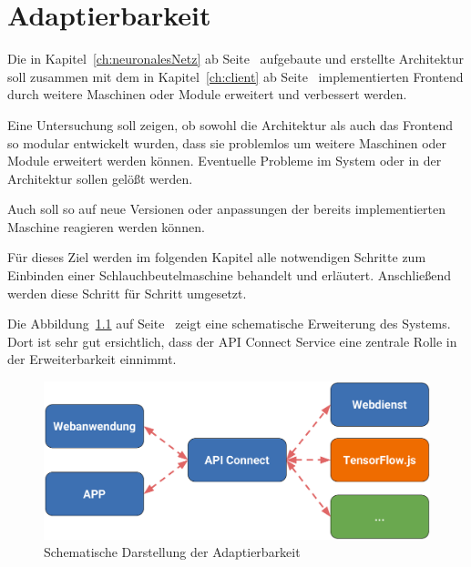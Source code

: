 \chapter{Adaptierbarkeit}
\label{ch:adaptierbarkeit}
Die in Kapitel~\ref{ch:neuronalesNetz} ab Seite~\pageref{ch:neuronalesNetz} aufgebaute und erstellte Architektur soll
zusammen mit dem in Kapitel~\ref{ch:client} ab Seite~\pageref{ch:client} implementierten Frontend durch weitere
Maschinen oder Module erweitert und verbessert werden.

Eine Untersuchung soll zeigen, ob sowohl die Architektur als auch das Frontend so modular entwickelt wurden, dass sie
problemlos um weitere Maschinen oder Module erweitert werden können. Eventuelle Probleme im System oder in der
Architektur sollen gelößt werden.

Auch soll so auf neue Versionen oder anpassungen der bereits implementierten Maschine reagieren werden können.

Für dieses Ziel werden im folgenden Kapitel alle notwendigen Schritte zum Einbinden einer Schlauchbeutelmaschine
behandelt und erläutert. Anschließend werden diese Schritt für Schritt umgesetzt.

Die Abbildung~\ref{fig:schematische_architektur_5} auf Seite~\pageref{fig:schematische_architektur_5} zeigt eine
schematische Erweiterung des Systems. Dort ist sehr gut ersichtlich, dass der API Connect Service eine zentrale Rolle
in der Erweiterbarkeit einnimmt.

\begin{figure}[h]
    \centering
    \includegraphics[width=\textwidth]{images/kapitel_5/architektur_schematisch.pdf}
    \caption{Schematische Darstellung der Adaptierbarkeit}
    \label{fig:schematische_architektur_5}
\end{figure}